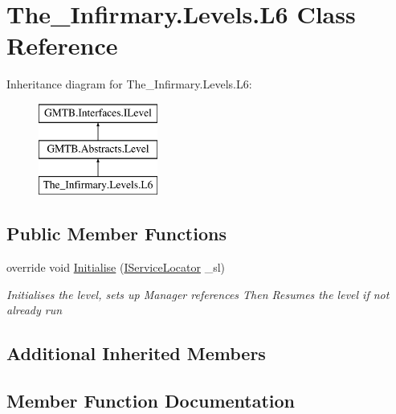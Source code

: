 \hypertarget{class_the___infirmary_1_1_levels_1_1_l6}{}\section{The\+\_\+\+Infirmary.\+Levels.\+L6 Class Reference}
\label{class_the___infirmary_1_1_levels_1_1_l6}
Inheritance diagram for The\+\_\+\+Infirmary.\+Levels.\+L6\+:\begin{figure}[H]
\begin{center}
\leavevmode
\includegraphics[height=3.000000cm]{class_the___infirmary_1_1_levels_1_1_l6}
\end{center}
\end{figure}
\subsection*{Public Member Functions}
\begin{DoxyCompactItemize}
\item 
override void \mbox{\hyperlink{class_the___infirmary_1_1_levels_1_1_l6_a430f45237d92f3cae4db4e3399c30029}{Initialise}} (\mbox{\hyperlink{interface_g_m_t_b_1_1_interfaces_1_1_i_service_locator}{I\+Service\+Locator}} \+\_\+sl)
\begin{DoxyCompactList}\small\item\em Initialises the level, sets up Manager references Then Resumes the level if not already run \end{DoxyCompactList}\end{DoxyCompactItemize}
\subsection*{Additional Inherited Members}


\subsection{Member Function Documentation}
\mbox{\label{class_the___infirmary_1_1_levels_1_1_l6_a430f45237d92f3cae4db4e3399c30029}} 
